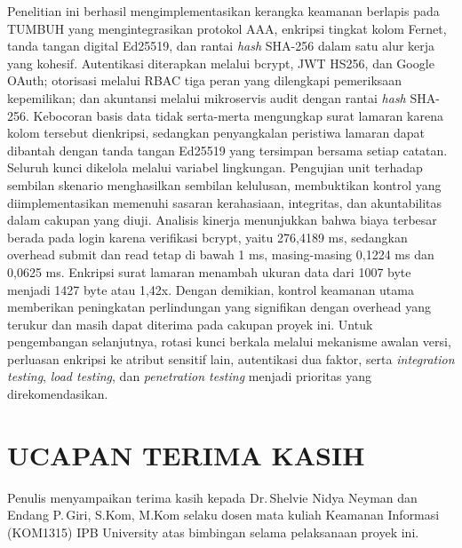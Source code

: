 \documentclass[12pt,a4paper]{article}
\begin{document}
Penelitian ini berhasil mengimplementasikan kerangka keamanan berlapis
pada TUMBUH yang mengintegrasikan protokol AAA, enkripsi tingkat kolom
Fernet, tanda tangan digital Ed25519, dan rantai \textit{hash} SHA-256
dalam satu alur kerja yang kohesif. Autentikasi diterapkan melalui
bcrypt, JWT HS256, dan Google OAuth; otorisasi melalui RBAC tiga peran
yang dilengkapi pemeriksaan kepemilikan; dan akuntansi melalui
mikroservis audit dengan rantai \textit{hash} SHA-256. Kebocoran basis
data tidak serta-merta mengungkap surat lamaran karena kolom tersebut
dienkripsi, sedangkan penyangkalan peristiwa lamaran dapat dibantah
dengan tanda tangan Ed25519 yang tersimpan bersama setiap catatan.
Seluruh kunci dikelola melalui variabel lingkungan. Pengujian unit
terhadap sembilan skenario menghasilkan sembilan kelulusan, membuktikan
kontrol yang diimplementasikan memenuhi sasaran kerahasiaan, integritas,
dan akuntabilitas dalam cakupan yang diuji. Analisis kinerja
menunjukkan bahwa biaya terbesar berada pada login karena verifikasi
bcrypt, yaitu 276,4189 ms, sedangkan overhead submit dan read tetap
di bawah 1 ms, masing-masing 0,1224 ms dan 0,0625 ms. Enkripsi surat
lamaran menambah ukuran data dari 1007 byte menjadi 1427 byte atau
1,42x. Dengan demikian, kontrol keamanan utama memberikan peningkatan
perlindungan yang signifikan dengan overhead yang terukur dan masih
dapat diterima pada cakupan proyek ini. Untuk pengembangan selanjutnya,
rotasi kunci berkala melalui mekanisme awalan versi, perluasan
enkripsi ke atribut sensitif lain, autentikasi dua faktor, serta
\textit{integration testing}, \textit{load testing}, dan
\textit{penetration testing} menjadi prioritas yang direkomendasikan.

\section*{UCAPAN TERIMA KASIH}

Penulis menyampaikan terima kasih kepada Dr.\,Shelvie Nidya Neyman dan
Endang P.\,Giri, S.Kom, M.Kom selaku dosen mata kuliah Keamanan
Informasi (KOM1315) IPB University atas bimbingan selama pelaksanaan
proyek ini.



\end{document}
